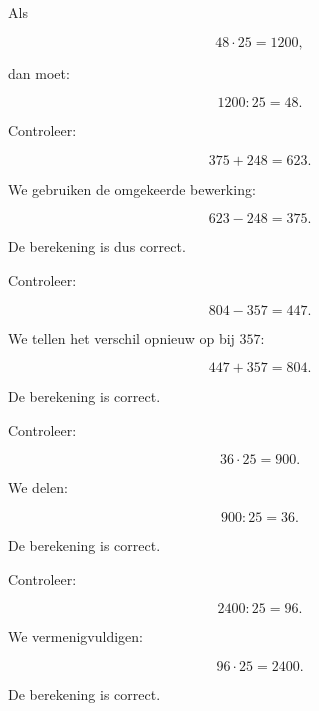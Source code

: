 \documentclass{ximera}
\begin{document}
Als

\[
48\cdot25=1200,
\]

dan moet:

\[
1200:25=48.
\]


\begin{oefening}{\oefB}

\begin{question}

Controleer:

\[
375+248=623.
\]

\begin{oplossing}

We gebruiken de omgekeerde bewerking:

\[
623-248=375.
\]

De berekening is dus correct.

\end{oplossing}

\end{question}


\begin{question}

Controleer:

\[
804-357=447.
\]

\begin{oplossing}

We tellen het verschil opnieuw op bij \(357\):

\[
447+357=804.
\]

De berekening is correct.

\end{oplossing}

\end{question}


\begin{question}

Controleer:

\[
36\cdot25=900.
\]

\begin{oplossing}

We delen:

\[
900:25=36.
\]

De berekening is correct.

\end{oplossing}

\end{question}


\begin{question}

Controleer:

\[
2400:25=96.
\]

\begin{oplossing}

We vermenigvuldigen:

\[
96\cdot25=2400.
\]

De berekening is correct.

\end{oplossing}

\end{question}

\end{oefening}
\end{document}
